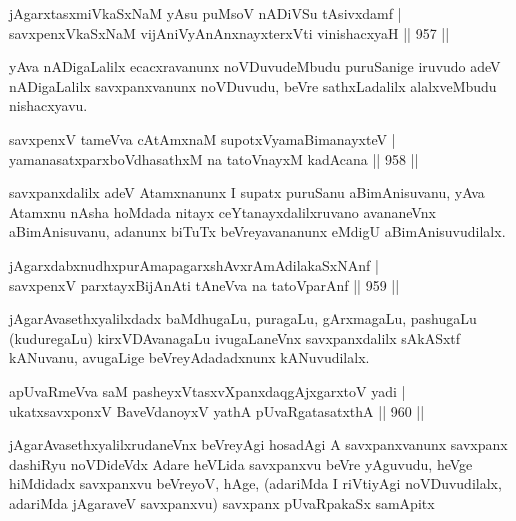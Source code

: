 
\begin{shl}
jAgarxtasxmiVkaSxNaM yAsu puMsoV nADiVSu tAsivxdamf | \\
savxpenxVkaSxNaM vijAniVyAnAnxnayxterxVti vinishacxyaH \hfill||  957 ||  
\end{shl}

\begin{artha}
yAva nADigaLalilx ecacxravanunx noVDuvudeMbudu puruSanige iruvudo adeV nADigaLalilx savxpanxvanunx noVDuvudu, beVre sathxLadalilx alalxveMbudu nishacxyavu.
\end{artha}


\begin{shl}
savxpenxV tameVva cA\s \s tAmxnaM supotxV\s yamaBimanayxteV | \\
yamanasatxparxboVdhasathxM na tatoV\s nayxM kadAcana \hfill||  958 ||  
\end{shl}

\begin{artha}
savxpanxdalilx adeV Atamxnanunx I supatx puruSanu aBimAnisuvanu, yAva Atamxnu nAsha hoMdada nitayx ceYtanayxdalilxruvano avananeVnx aBimAnisuvanu, adanunx biTuTx beVreyavananunx eMdigU aBimAnisuvudilalx.
\end{artha}


\begin{shl}
jAgarxdabxnudhxpurAmapagarxshAvxrAmAdilakaSxNAnf | \\
savxpenxV parxtayxBijAnAti tAneVva na tatoV\s parAnf \hfill||  959 ||  
\end{shl}

\begin{artha}
jAgarAvasethxyalilxdadx baMdhugaLu, puragaLu, gArxmagaLu, pashugaLu (kuduregaLu) kirxVDAvanagaLu ivugaLaneVnx savxpanxdalilx sAkASxtf kANuvanu, avugaLige beVreyAdadadxnunx kANuvudilalx.
\end{artha}

\begin{shl}
apUvaRmeVva saM pasheyxVtasxvXpanxdaqgAjxgarxtoV yadi | \\
ukatxsavxponxV BaveVdanoyxV yathA pUvaRgatasatxthA \hfill||  960 ||  
\end{shl}

\begin{artha}
jAgarAvasethxyalilxrudaneVnx beVreyAgi hosadAgi A savxpanxvanunx savxpanx dashiRyu noVDideVdx Adare heVLida savxpanxvu beVre yAguvudu, heVge hiMdidadx savxpanxvu beVreyoV, hAge, (adariMda I riVtiyAgi noVDuvudilalx, adariMda jAgaraveV savxpanxvu) 
savxpanx pUvaRpakaSx samApitx
\end{artha}

